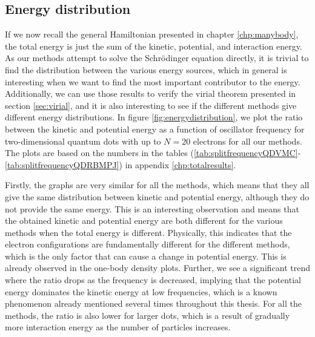 \subsection{Energy distribution} \label{sec:energydistributions}
If we now recall the general Hamiltonian presented in chapter \ref{chp:manybody}, the total energy is just the sum of the kinetic, potential, and interaction energy. As our methods attempt to solve the Schrödinger equation directly, it is trivial to find the distribution between the various energy sources, which in general is interesting when we want to find the most important contributor to the energy. Additionally, we can use those results to verify the virial theorem presented in section \ref{sec:virial}, and it is also interesting to see if the different methods give different energy distributions. In figure \eqref{fig:energydistribution}, we plot the ratio between the kinetic and potential energy as a function of oscillator frequency for two-dimensional quantum dots with up to $N=20$ electrons for all our methods. The plots are based on the numbers in the tables (\ref{tab:splitfrequencyQDVMC}-\ref{tab:splitfrequencyQDRBMPJ}) in appendix \ref{chp:totalresults}. 



Firstly, the graphs are very similar for all the methods, which means that they all give the same distribution between kinetic and potential energy, although they do not provide the same energy. This is an interesting observation and means that the obtained kinetic and potential energy are both different for the various methods when the total energy is different. Physically, this indicates that the electron configurations are fundamentally different for the different methods, which is the only factor that can cause a change in potential energy. This is already observed in the one-body density plots. Further, we see a significant trend where the ratio drops as the frequency is decreased, implying that the potential energy dominates the kinetic energy at low frequencies, which is a known phenomenon already mentioned several times throughout this thesis. For all the methods, the ratio is also lower for larger dots, which is a result of gradually more interaction energy as the number of particles increases.

